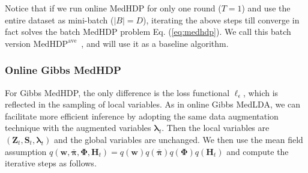 \documentclass[twoside,11pt]{article}
\newcommand{\Zv}{\bm{Z}}
\newcommand{\Sv}{\bm{S}}
\newcommand{\Hv}{\bm{H}}
\newcommand{\wv}{\bm{w}}
\newcommand{\Phiv}{\bm{\Phi}}
\newcommand{\lambdav}{\bm \lambda}
\newcommand{\barpiv}{\bm{\bar{\pi}}}
\newcommand\MedHDPave{$\text{MedHDP}^{\text{ave}}$~}
\begin{document}
Notice that if we run online MedHDP for only one round ($T = 1$) and use the entire dataset as mini-batch ($|B| = D$), iterating the above steps till converge in fact solves the batch MedHDP problem Eq. (\ref{eq:medhdp}). We call this batch version \MedHDPave, and will use it as a baseline algorithm.


\subsubsection{Online Gibbs MedHDP}

For Gibbs MedHDP, the only difference is the loss functional $\ell_\epsilon$, which is reflected in the sampling of local variables. As in online Gibbs MedLDA, we can facilitate more efficient inference by adopting the same data augmentation technique with the augmented variables $\lambdav_t$. Then the local variables are $(\Zv_t, \Sv_t, \lambdav_t)$ and the global variables are unchanged. We then use the mean field assumption $q(\wv, \barpiv, \Phiv, \Hv_t) = q(\wv) q(\barpiv) q(\Phiv) q(\Hv_t)$ and compute the iterative steps as follows.
\end{document}
